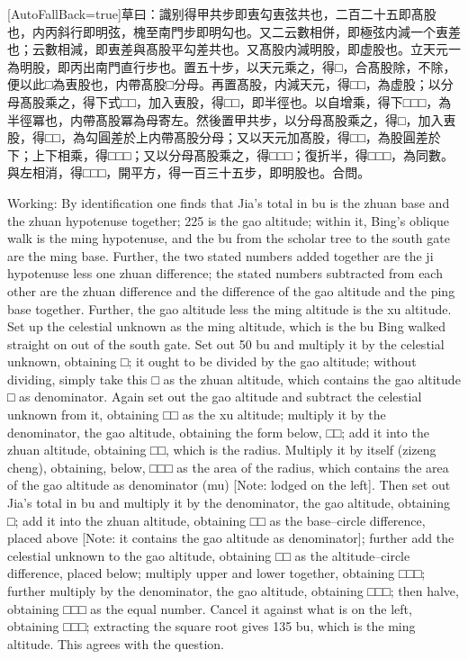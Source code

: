 \documentclass[11pt]{article}
\newcommand{\zhsmall}{\footnotesize\color{black!70}}
\newcommand{\unitlabel}[1]{\marginpar{\raggedleft\tiny\color{gray}#1}}
\newenvironment{unitzh}{\par\CJKfontspec{Noto Serif CJK SC}[AutoFallBack=true]\large\linespread{1.25}\selectfont}{\par}
\newenvironment{uniten}{\par\small\color{black!85}}{\par\medskip}
\begin{document}
\begin{unitzh}\unitlabel{ceyuan-023.23}草曰：識别得甲共步即叀勾叀弦共也，二百二十五即髙股也，内丙斜行即明弦，槐至南門步即明勾也。又二云數相併，即極弦内減一个叀差也；云數相減，即叀差與髙股平勾差共也。又髙股内減明股，即虚股也。立天元一為明股，即丙出南門直行步也。置五十步，以天元乘之，得□，合髙股除，不除，便以此□為叀股也，内帶髙股□分母。再置髙股，内減天元，得□□，為虚股；以分母髙股乘之，得下式□□，加入叀股，得□□，即半徑也。以自增乘，得下□□□，為半徑冪也，内帶髙股冪為母{\zhsmall 寄左}。然後置甲共步，以分母髙股乘之，得□，加入叀股，得□□，為勾圓差於上{\zhsmall 内帶髙股分母}；又以天元加髙股，得□□，為股圓差於下；上下相乘，得□□□；又以分母髙股乘之，得□□□；復折半，得□□□，為同數。與左相消，得□□□，開平方，得一百三十五步，即明股也。合問。\end{unitzh}
\begin{uniten}Working: By identification one finds that Jia's total in bu is the zhuan base and the zhuan hypotenuse together; 225 is the gao altitude; within it, Bing's oblique walk is the ming hypotenuse, and the bu from the scholar tree to the south gate are the ming base. Further, the two stated numbers added together are the ji hypotenuse less one zhuan difference; the stated numbers subtracted from each other are the zhuan difference and the difference of the gao altitude and the ping base together. Further, the gao altitude less the ming altitude is the xu altitude. Set up the celestial unknown as the ming altitude, which is the bu Bing walked straight on out of the south gate. Set out 50 bu and multiply it by the celestial unknown, obtaining □; it ought to be divided by the gao altitude; without dividing, simply take this □ as the zhuan altitude, which contains the gao altitude □ as denominator. Again set out the gao altitude and subtract the celestial unknown from it, obtaining □□ as the xu altitude; multiply it by the denominator, the gao altitude, obtaining the form below, □□; add it into the zhuan altitude, obtaining □□, which is the radius. Multiply it by itself (zizeng cheng), obtaining, below, □□□ as the area of the radius, which contains the area of the gao altitude as denominator (mu) [Note: lodged on the left]. Then set out Jia's total in bu and multiply it by the denominator, the gao altitude, obtaining □; add it into the zhuan altitude, obtaining □□ as the base–circle difference, placed above [Note: it contains the gao altitude as denominator]; further add the celestial unknown to the gao altitude, obtaining □□ as the altitude–circle difference, placed below; multiply upper and lower together, obtaining □□□; further multiply by the denominator, the gao altitude, obtaining □□□; then halve, obtaining □□□ as the equal number. Cancel it against what is on the left, obtaining □□□; extracting the square root gives 135 bu, which is the ming altitude. This agrees with the question.\end{uniten}
\end{document}
